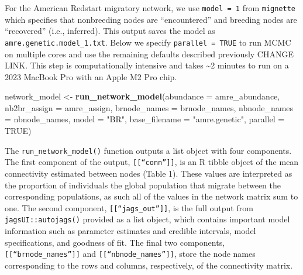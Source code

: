 \documentclass[
]{book}
\newenvironment{Shaded}{\begin{snugshade}}{\end{snugshade}}
\newcommand{\AttributeTok}[1]{\textcolor[rgb]{0.13,0.29,0.53}{#1}}
\newcommand{\ConstantTok}[1]{\textcolor[rgb]{0.56,0.35,0.01}{#1}}
\newcommand{\FunctionTok}[1]{\textcolor[rgb]{0.13,0.29,0.53}{\textbf{#1}}}
\newcommand{\NormalTok}[1]{#1}
\newcommand{\OtherTok}[1]{\textcolor[rgb]{0.56,0.35,0.01}{#1}}
\newcommand{\SpecialCharTok}[1]{\textcolor[rgb]{0.81,0.36,0.00}{\textbf{#1}}}
\newcommand{\StringTok}[1]{\textcolor[rgb]{0.31,0.60,0.02}{#1}}
\begin{document}
For the American Redstart migratory network, we use \texttt{model\ =\ 1} from \texttt{mignette} which specifies that nonbreeding nodes are ``encountered'' and breeding nodes are ``recovered'' (i.e., inferred). This output saves the model as \texttt{amre.genetic.model\_1.txt}. Below we specify \texttt{parallel\ =\ TRUE} to run MCMC on multiple cores and use the remaining defaults described previously CHANGE LINK. This step is computationally intensive and takes \textasciitilde2 minutes to run on a 2023 MacBook Pro with an Apple M2 Pro chip.

\begin{Shaded}
\begin{Highlighting}[]
\NormalTok{network\_model }\OtherTok{\textless{}{-}} \FunctionTok{run\_network\_model}\NormalTok{(}\AttributeTok{abundance =}\NormalTok{ amre\_abundance, }
                           \AttributeTok{nb2br\_assign =}\NormalTok{ amre\_assign,}
                           \AttributeTok{brnode\_names =}\NormalTok{ brnode\_names, }
                           \AttributeTok{nbnode\_names =}\NormalTok{ nbnode\_names,}
                           \AttributeTok{model =} \StringTok{"BR"}\NormalTok{, }\AttributeTok{base\_filename =} \StringTok{"amre.genetic"}\NormalTok{,}
                           \AttributeTok{parallel =} \ConstantTok{TRUE}\NormalTok{)}
\end{Highlighting}
\end{Shaded}

The \texttt{run\_network\_model()} function outputs a list object with four components. The first component of the output, \texttt{{[}{[}“conn”{]}{]}}, is an R tibble object of the mean connectivity estimated between nodes (Table 1). These values are interpreted as the proportion of individuals the global population that migrate between the corresponding populations, as such all of the values in the network matrix sum to one. The second component, \texttt{{[}{[}“jags\_out”{]}{]}}, is the full output from \texttt{jagsUI::autojags()} provided as a list object, which contains important model information such as parameter estimates and credible intervals, model specifications, and goodness of fit. The final two components, \texttt{{[}{[}“brnode\_names”{]}{]}} and \texttt{{[}{[}“nbnode\_names”{]}{]}}, store the node names corresponding to the rows and columns, respectively, of the connectivity matrix.

\begin{Shaded}
\end{Shaded}
\end{document}
